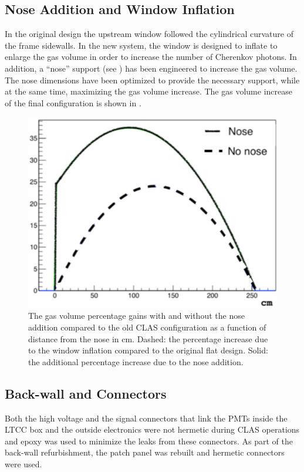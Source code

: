 \subsection{Nose Addition and Window Inflation}

In the original design the upstream window followed the cylindrical curvature of the frame sidewalls. In the new system,
the window is designed to inflate to enlarge the gas volume in order to increase the number of Cherenkov photons. In
addition, a ``nose'' support (see ) has been engineered to increase the gas volume. The nose dimensions have
been optimized to provide the necessary support, while at the same time, maximizing the gas volume increase. The gas
volume increase of the final configuration is shown in .

\begin{figure}[h]
	\centering
	\includegraphics[width=0.98\columnwidth, height=0.7\columnwidth]{img/noseVolume.png}
	\caption{The gas volume percentage gains with and without the nose addition compared to the old CLAS
          configuration as a function of distance from the nose in cm. Dashed: the percentage increase due to the
          window inflation compared to the original flat design. Solid: the additional percentage increase due to the
          nose addition.}
	\label{fig:noseVolume}
\end{figure}

\subsection{Back-wall and Connectors}

Both the high voltage and the signal connectors that link the PMTs inside the LTCC box and the outside electronics
were not hermetic during CLAS operations and epoxy was used to minimize the leaks from these connectors. As
part of the back-wall refurbishment, the patch panel was rebuilt and hermetic connectors were used.

